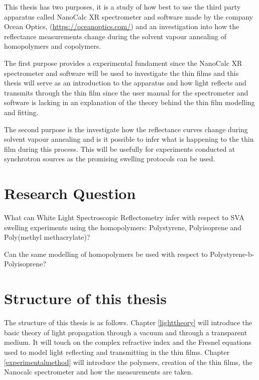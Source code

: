 \documentclass[MasterThesisMain.tex]{subfiles}
\begin{document}
This thesis has two purposes, it is a study of how best to use the third party apparatus called NanoCalc XR spectrometer and software made by the company Ocean Optics, (\url{https://oceanoptics.com/}) and an investigation into how the reflectance measurements change during the solvent vapour annealing of homopolymers and copolymers.

The first purpose provides a experimental fundament since the NanoCalc XR spectrometer and software will be used to investigate the thin films and this thesis will serve as an introduction to the apparatus and how light reflects and transmits through the thin film since the user manual for the spectrometer and software is lacking in an explanation of the theory behind the thin film modelling and fitting.

The second purpose is the investigate how the reflectance curves change during solvent vapour annealing and is it possible to infer what is happening to the thin film during this process. This will be usefully for experiments conducted at synchrotron sources as the promising swelling protocols can be used.     

\section{Research Question}
What can White Light Spectroscopic Reflectometry infer with respect to SVA swelling experiments using the homopolymers: Polystyrene, Polyisoprene and Poly(methyl methacrylate)? 
		
Can the same modelling of homopolymers be used with respect to Polystyrene-b-Polyisoprene?
	
\section{Structure of this thesis} 
The structure of this thesis is as follows. Chapter \ref{lighttheory} will introduce the basic theory of light propagation through a vacuum and through a transparent medium. It will touch on the complex refractive index and the Fresnel equations used to model light reflecting and transmitting in the thin films. Chapter \ref{experimentalmethod} will introduce the polymers, creation of the thin films, the Nanocalc spectrometer and how the measurements are taken.          
\end{document}
